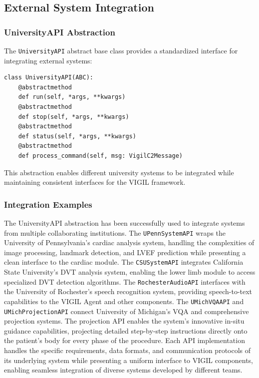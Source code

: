\documentclass[12pt,a4paper]{article}
\begin{document}
\subsection{External System Integration}

\subsubsection{UniversityAPI Abstraction}

The \texttt{UniversityAPI} abstract base class provides a standardized interface for integrating external systems:

\begin{verbatim}
class UniversityAPI(ABC):
    @abstractmethod
    def run(self, *args, **kwargs)
    @abstractmethod
    def stop(self, *args, **kwargs)
    @abstractmethod
    def status(self, *args, **kwargs)
    @abstractmethod
    def process_command(self, msg: VigilC2Message)
\end{verbatim}

This abstraction enables different university systems to be integrated while maintaining consistent interfaces for the VIGIL framework.

\subsubsection{Integration Examples}

The UniversityAPI abstraction has been successfully used to integrate systems from multiple collaborating institutions. The \texttt{UPennSystemAPI} wraps the University of Pennsylvania's cardiac analysis system, handling the complexities of image processing, landmark detection, and LVEF prediction while presenting a clean interface to the cardiac module. The \texttt{CSUSystemAPI} integrates California State University's DVT analysis system, enabling the lower limb module to access specialized DVT detection algorithms. The \texttt{RochesterAudioAPI} interfaces with the University of Rochester's speech recognition system, providing speech-to-text capabilities to the VIGIL Agent and other components. The \texttt{UMichVQAAPI} and \texttt{UMichProjectionAPI} connect University of Michigan's VQA and comprehensive projection systems. The projection API enables the system's innovative in-situ guidance capabilities, projecting detailed step-by-step instructions directly onto the patient's body for every phase of the procedure. Each API implementation handles the specific requirements, data formats, and communication protocols of its underlying system while presenting a uniform interface to VIGIL components, enabling seamless integration of diverse systems developed by different teams.
\end{document}
